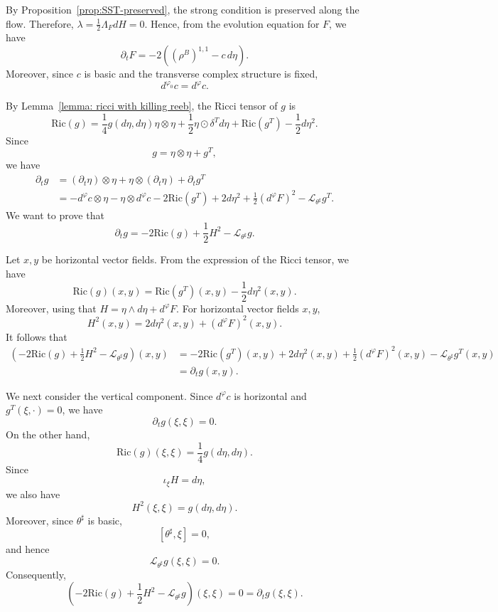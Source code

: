 \documentclass{article}
\makeatletter
\renewenvironment{proof}[1][\proofname]{%
  \par\pushQED{\qed}%
  \normalfont\topsep6\p@\@plus6\p@\relax
  \trivlist
  \item[\hskip\labelsep
        \textbf{\textup{#1}}\@addpunct{.}]\ignorespaces
}{%
  \popQED\endtrivlist\@endpefalse
}
\theoremstyle{definition}
\newcommand{\Ric}{\mathrm{Ric}}
\renewcommand{\phi}{\varphi}
\numberwithin{equation}{section}
\makeatother
\begin{document}
\begin{proof}

By Proposition~\ref{prop:SST-preserved}, the strong condition is preserved along the flow. Therefore, $\lambda=\frac12\Lambda_FdH=0$.
Hence, from the evolution equation for $F$, we have
\[
\partial_tF
=
-2\left((\rho^B)^{1,1}-c\,d\eta\right).
\]
Moreover, since $c$ is basic and the transverse complex structure is fixed,
\[
d^{\phi_0}c=d^\phi c.
\]

By Lemma~\ref{lemma: ricci with killing reeb}, the Ricci tensor of $g$ is
\[
\Ric(g)
=
\frac14g(d\eta,d\eta)\eta\otimes\eta
+\frac12\eta\odot\delta^Td\eta
+\Ric(g^T)
-\frac12d\eta^2.
\]
Since
\[
g=\eta\otimes\eta+g^T,
\]
we have
\[
\begin{aligned}
\partial_tg
&=
(\partial_t\eta)\otimes\eta
+\eta\otimes(\partial_t\eta)
+\partial_tg^T\\
&=
-d^\phi c\otimes\eta
-\eta\otimes d^\phi c
-2\Ric(g^T)
+2d\eta^2
+\frac12(d^\phi F)^2
-\mathcal L_{\theta^\sharp}g^T.
\end{aligned}
\]
We want to prove that
\[
\partial_tg
=
-2\Ric(g)+\frac12H^2-\mathcal L_{\theta^\sharp}g.
\]

Let $x,y$ be horizontal vector fields. From the expression of the Ricci tensor, we have
\[
\Ric(g)(x,y)
=
\Ric(g^T)(x,y)-\frac12d\eta^2(x,y).
\]
Moreover, using that $H=\eta\wedge d\eta+d^\phi F$. For horizontal vector fields $x,y$,
\[
H^2(x,y)
=
2d\eta^2(x,y)+(d^\phi F)^2(x,y).
\]
It follows that
\[
\begin{aligned}
\left(
-2\Ric(g)+\frac12H^2-\mathcal L_{\theta^\sharp}g
\right)(x,y)
&=
-2\Ric(g^T)(x,y)
+2d\eta^2(x,y)
+\frac12(d^\phi F)^2(x,y)
-\mathcal L_{\theta^\sharp}g^T(x,y)\\
&
=
\partial_tg(x,y).
\end{aligned}
\]

We next consider the vertical component. Since $d^\phi c$ is horizontal and $g^T(\xi,\cdot)=0$, we have
\[
\partial_tg(\xi,\xi)=0.
\]
On the other hand,
\[
\Ric(g)(\xi,\xi)
=
\frac14g(d\eta,d\eta).
\]
Since
\[
\iota_\xi H=d\eta,
\]
we also have
\[
H^2(\xi,\xi)=g(d\eta,d\eta).
\]
Moreover, since $\theta^\sharp$ is basic,
\[
[\theta^\sharp,\xi]=0,
\]
and hence
\[
\mathcal L_{\theta^\sharp}g(\xi,\xi)=0.
\]
Consequently,
\[
\left(
-2\Ric(g)+\frac12H^2-\mathcal L_{\theta^\sharp}g
\right)(\xi,\xi)
=
0
=
\partial_tg(\xi,\xi).
\]


\end{proof}
\end{document}
